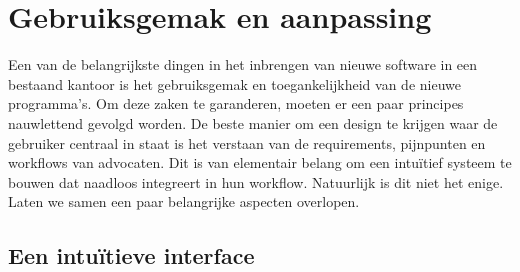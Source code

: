 \section{Gebruiksgemak en aanpassing}
Een van de belangrijkste dingen in het inbrengen van nieuwe software in een bestaand kantoor is het gebruiksgemak en toegankelijkheid van de nieuwe programma's. Om deze zaken te garanderen, 
moeten er een paar principes nauwlettend gevolgd worden. De beste manier om een design te krijgen waar de gebruiker centraal in staat is het verstaan van de requirements, pijnpunten en 
workflows van advocaten. Dit is van elementair belang om een intuïtief systeem te bouwen dat naadloos integreert in hun workflow. Natuurlijk is dit niet het enige. 
Laten we samen een paar belangrijke aspecten overlopen. 

\subsection{Een intuïtieve interface}

